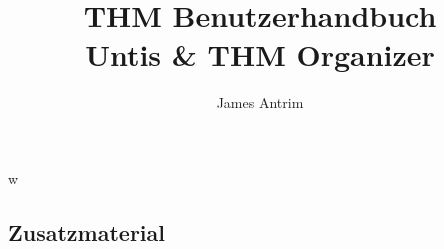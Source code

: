 \documentclass[]{report}
\title{THM Benutzerhandbuch \\Untis \& THM Organizer}
\author{James Antrim}
\begin{document}
\maketitle

\newpage
\thispagestyle{empty}
\section*{}

\newpage
\tableofcontents
\thispagestyle{empty}

\newpage
\setcounter{page}{1}



w



\begin{appendices}
\chapter{Zusatzmaterial}


	
\end{appendices}
\end{document}
